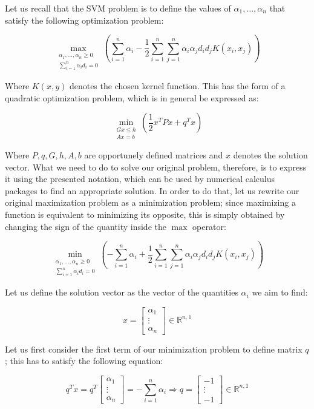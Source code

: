 \documentclass[letterpaper,headings=standardclasses]{scrartcl}
\begin{document}
Let us recall that the SVM problem is to define the values of $\alpha_1, \dots, \alpha_n$ that satisfy the following optimization problem:

$$ \max_{\substack{\alpha_1, \dots, \alpha_n \ge 0 \\ \scriptstyle \sum_{i = 1}^n \alpha_i d_i = 0}}{\left( \sum_{i = 1}^n \alpha_i - \frac{1}{2} \sum_{i = 1}^n \sum_{j = 1}^n \alpha_i \alpha_j d_i d_j K(x_i, x_j) \right)} $$

Where $K(x,y)$ denotes the chosen kernel function. This has the form of a quadratic optimization problem, which is in general be expressed as:

$$ \min_{\substack{Gx \le h \\ \scriptstyle Ax = b}}{\left( \frac{1}{2} x^T P x + q^T x \right)} $$

Where $P, q, G, h, A, b$ are opportunely defined matrices and $x$ denotes the solution vector. What we need to do to solve our original problem, therefore, is to express it using the presented notation, which can be used by numerical calculus packages to find an appropriate solution. In order to do that, let us rewrite our original maximization problem as a minimization problem; since maximizing a function is equivalent to minimizing its opposite, this is simply obtained by changing the sign of the quantity inside the $\max$ operator:

$$ \min_{\substack{\alpha_1, \dots, \alpha_n \ge 0 \\ \scriptstyle \sum_{i = 1}^n \alpha_i d_i = 0}}{\left( - \sum_{i = 1}^n \alpha_i + \frac{1}{2} \sum_{i = 1}^n \sum_{j = 1}^n \alpha_i \alpha_j d_i d_j K(x_i, x_j) \right)} $$

Let us define the solution vector as the vector of the quantities $\alpha_i$ we aim to find:

$$ x = \left[ \begin{matrix} \alpha_1 \\ \vdots \\ \alpha_n \end{matrix} \right] \in \mathbb{R}^{n,1} $$

Let us first consider the first term of our minimization problem to define matrix $q$; this has to satisfy the following equation:

$$ q^T x = q^T \left[ \begin{matrix} \alpha_1 \\ \vdots \\ \alpha_n \end{matrix} \right] = - \sum_{i = 1}^n \alpha_i \Rightarrow q = \left[ \begin{matrix} -1 \\ \vdots \\ -1 \end{matrix} \right] \in \mathbb{R}^{n,1} $$
\end{document}
